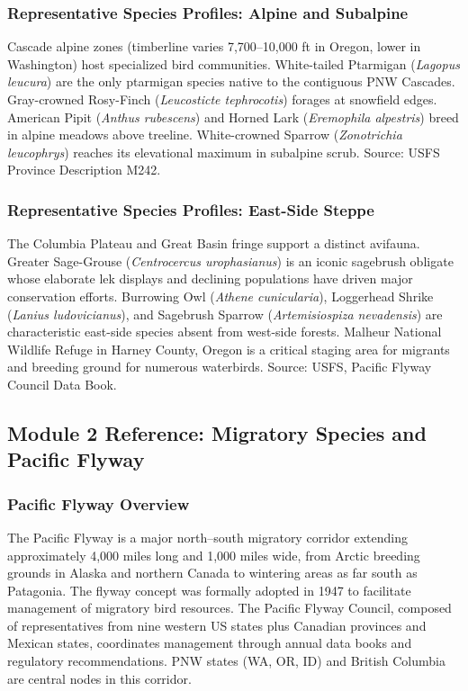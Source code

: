 \documentclass[11pt,letterpaper]{article}
\begin{document}
\subsubsection{Representative Species Profiles: Alpine and Subalpine}
Cascade alpine zones (timberline varies 7,700--10,000 ft in Oregon, lower in Washington) host specialized bird communities. White-tailed Ptarmigan (\textit{Lagopus leucura}) are the only ptarmigan species native to the contiguous PNW Cascades. Gray-crowned Rosy-Finch (\textit{Leucosticte tephrocotis}) forages at snowfield edges. American Pipit (\textit{Anthus rubescens}) and Horned Lark (\textit{Eremophila alpestris}) breed in alpine meadows above treeline. White-crowned Sparrow (\textit{Zonotrichia leucophrys}) reaches its elevational maximum in subalpine scrub. Source: USFS Province Description M242.

\subsubsection{Representative Species Profiles: East-Side Steppe}
The Columbia Plateau and Great Basin fringe support a distinct avifauna. Greater Sage-Grouse (\textit{Centrocercus urophasianus}) is an iconic sagebrush obligate whose elaborate lek displays and declining populations have driven major conservation efforts. Burrowing Owl (\textit{Athene cunicularia}), Loggerhead Shrike (\textit{Lanius ludovicianus}), and Sagebrush Sparrow (\textit{Artemisiospiza nevadensis}) are characteristic east-side species absent from west-side forests. Malheur National Wildlife Refuge in Harney County, Oregon is a critical staging area for migrants and breeding ground for numerous waterbirds. Source: USFS, Pacific Flyway Council Data Book.

\subsection{Module 2 Reference: Migratory Species and Pacific Flyway}

\subsubsection{Pacific Flyway Overview}
The Pacific Flyway is a major north--south migratory corridor extending approximately 4,000 miles long and 1,000 miles wide, from Arctic breeding grounds in Alaska and northern Canada to wintering areas as far south as Patagonia. The flyway concept was formally adopted in 1947 to facilitate management of migratory bird resources. The Pacific Flyway Council, composed of representatives from nine western US states plus Canadian provinces and Mexican states, coordinates management through annual data books and regulatory recommendations. PNW states (WA, OR, ID) and British Columbia are central nodes in this corridor.
\end{document}
